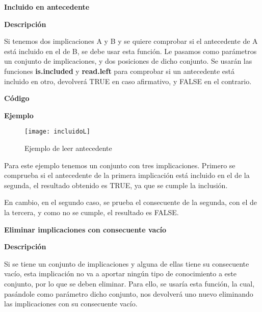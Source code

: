     \bigskip

\textbf{ \large Incluido en antecedente}

\smallskip

    \textbf{Descripci\'on}

    Si tenemos dos implicaciones A y B y se quiere comprobar si el antecedente de A est\'a incluido en el de B, se debe usar 
    esta funci\'on. Le pasamos como par\'ametros un conjunto de implicaciones, y dos posiciones de dicho conjunto. Se usar\'an 
    las funciones \textbf{is.included} y \textbf{read.left} para comprobar si un antecedente est\'a incluido en otro, devolver\'a TRUE en caso 
    afirmativo, y FALSE en el contrario.
    \\
    \clearpage

    \textbf{C\'odigo}

    
    \bigskip

    \textbf{Ejemplo}

    \begin{figure}[H]
        \centering
        \texttt{[image: incluidoL]}
        \caption{Ejemplo de leer antecedente}
        \label{fig:incluidoL}
    \end{figure}

    Para este ejemplo tenemos un conjunto con tres implicaciones. Primero se comprueba si el antecedente de la primera implicaci\'on 
    est\'a incluido en el de la segunda, el resultado obtenido es TRUE, ya que se cumple la inclusi\'on.

    En cambio, en el segundo caso, se prueba el consecuente de la segunda, con el de la tercera, y como no se cumple, el resultado es FALSE.
    \\

    \bigskip

\textbf{ \large Eliminar implicaciones con consecuente vac\'io}

\smallskip

    \textbf{Descripci\'on}

    Si se tiene un conjunto de implicaciones y alguna de ellas tiene su consecuente vac\'io, esta implicaci\'on no va a 
    aportar ning\'un tipo de conocimiento a este conjunto, por lo que se deben eliminar. Para ello, se usar\'ia esta funci\'on, 
    la cual, pas\'andole como par\'ametro dicho conjunto, nos devolver\'a uno nuevo eliminando las implicaciones con su consecuente 
    vac\'io.
    \\
    \clearpage

